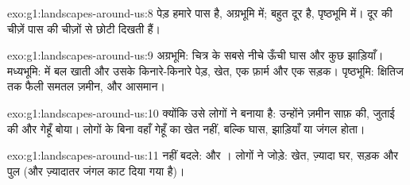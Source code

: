 \begin{solution}{exo:g1:landscapes-around-us:8}
पेड़ हमारे पास है, अग्रभूमि में;  बहुत दूर है, पृष्ठभूमि में। दूर
की चीज़ें पास की चीज़ों से छोटी दिखती हैं।
\end{solution}

\begin{solution}{exo:g1:landscapes-around-us:9}
अग्रभूमि: चित्र के सबसे नीचे ऊँची घास और कुछ झाड़ियाँ।
मध्यभूमि:  में बल खाती  और उसके किनारे-किनारे पेड़, खेत, एक
फ़ार्म और एक सड़क।
पृष्ठभूमि: क्षितिज तक फैली समतल ज़मीन, और आसमान।
\end{solution}

\begin{solution}{exo:g1:landscapes-around-us:10}
क्योंकि उसे लोगों ने बनाया है: उन्होंने ज़मीन साफ़ की, जुताई की और गेहूँ
बोया। लोगों के बिना वहाँ गेहूँ का खेत नहीं, बल्कि घास, झाड़ियाँ या जंगल
होता।
\end{solution}

\begin{solution}{exo:g1:landscapes-around-us:11}
नहीं बदले:  और । लोगों ने जोड़े: खेत, ज़्यादा घर, सड़क और पुल
(और ज़्यादातर जंगल काट दिया गया है)।
\end{solution}

